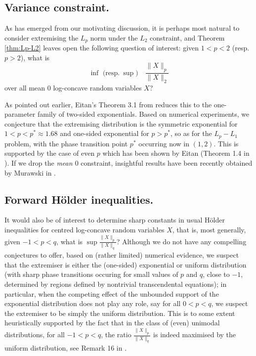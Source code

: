 \documentclass[10pt]{amsart}
\newcommand{\1}{\textbf{1}}
\newcommand{\red}{}
\theoremstyle{remark}
\theoremstyle{definition}
\begin{document}
\subsection{Variance constraint.} 
{\red As has emerged} from our motivating discussion, it is perhaps most natural to consider extremising the $L_p$ norm under the $L_2$ constraint, and Theorem \ref{thm:Lp-L2} leaves open the following question of interest: given $1 < p < 2$ (resp. $p > 2$), what is
\[ 
\inf \text{    (resp.} \ \sup) \quad  \frac{\|X\|_p}{\|X\|_2}
 \]
over all mean $0$ log-concave random variables $X$? 

As pointed out earlier, Eitan's Theorem 3.1 from \cite{Eitan} reduces this to the one-parameter family of two-sided exponentials. Based on numerical experiments, we conjecture that the extremising distribution is the symmetric exponential for $1 < p < p^* \approx 1.68$ and one-sided exponential for $p > p^*$, so as for the $L_p-L_1$ problem, with the phase transition point $p^*$ {\red occurring} now in $(1,2)$. This is supported by the case of even $p$ which has been {\red shown} by Eitan (Theorem 1.4 in \cite{Eitan}). If we drop the \emph{mean $0$} constraint, insightful results have been recently obtained by Murawski in \cite{Mur}.



\subsection{Forward H\"older inequalities.}
It would also be of interest to determine sharp constants in usual H\"older inequalities for centred log-concave random variables $X$, that is, most generally, given $-1 < p < q$, what is $ \sup \frac{\|X\|_p}{\|X\|_q}$? 
{\red Although we do not have any compelling conjectures to offer, based on (rather limited) numerical evidence, we suspect that the extremiser is either the (one-sided) exponential or uniform distribution (with sharp phase transitions occuring for small values of $p$ and $q$, close to $-1$, determined by regions defined by nontrivial transcendental equations); in particular, when the competing effect of the unbounded support of the exponential distribution does not play any role, say for all $0 < p < q$, we suspect the extremiser to be simply the uniform distribution. This is to some extent heuristically supported by the fact that in the class of (even) unimodal distributions, for all $-1 < p < q$, the ratio $\frac{\|X\|_p}{\|X\|_q}$ is indeed maximised by the uniform distribution, see Remark 16 in \cite{ENT2}.}
\end{document}
